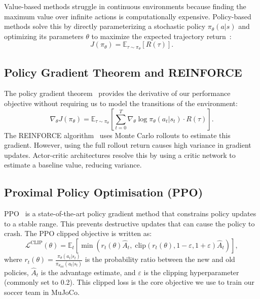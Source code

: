 Value-based methods struggle in continuous environments because finding the maximum value over infinite actions is computationally expensive. Policy-based methods solve this by directly parameterizing a stochastic policy $\pi_\theta(a|s)$ and optimizing its parameters $\theta$ to maximize the expected trajectory return~\citep{sutton1999policy}:
\begin{equation}
    J(\pi_\theta) = \mathbb{E}_{\tau \sim \pi_\theta} \left[ R(\tau) \right].
    \label{eq:policy_objective}
\end{equation}

\subsection{Policy Gradient Theorem and REINFORCE}

The policy gradient theorem~\citep{sutton1999policy} provides the derivative of our performance objective without requiring us to model the transitions of the environment:
\begin{equation}
    \nabla_\theta J(\pi_\theta) = \mathbb{E}_{\tau \sim \pi_\theta} \left[ \sum_{t=0}^{T} \nabla_\theta \log \pi_\theta(a_t|s_t) \cdot R(\tau) \right].
    \label{eq:policy_gradient}
\end{equation}
The REINFORCE algorithm~\citep{williams1992reinforce} uses Monte Carlo rollouts to estimate this gradient. However, using the full rollout return causes high variance in gradient updates. Actor-critic architectures resolve this by using a critic network to estimate a baseline value, reducing variance.

\subsection{Proximal Policy Optimisation (PPO)}

PPO~\citep{schulman2017proximal} is a state-of-the-art policy gradient method that constrains policy updates to a stable range. This prevents destructive updates that can cause the policy to crash. The PPO clipped objective is written as:
\begin{equation}
    \mathcal{L}^{\text{CLIP}}(\theta) = \mathbb{E}_t \left[ \min\left( r_t(\theta) \hat{A}_t,\; \text{clip}(r_t(\theta), 1-\varepsilon, 1+\varepsilon) \hat{A}_t \right) \right],
    \label{eq:ppo_clip}
\end{equation}
where $r_t(\theta) = \frac{\pi_\theta(a_t|s_t)}{\pi_{\theta_\text{old}}(a_t|s_t)}$ is the probability ratio between the new and old policies, $\hat{A}_t$ is the advantage estimate, and $\varepsilon$ is the clipping hyperparameter (commonly set to 0.2). This clipped loss is the core objective we use to train our soccer team in MuJoCo.

